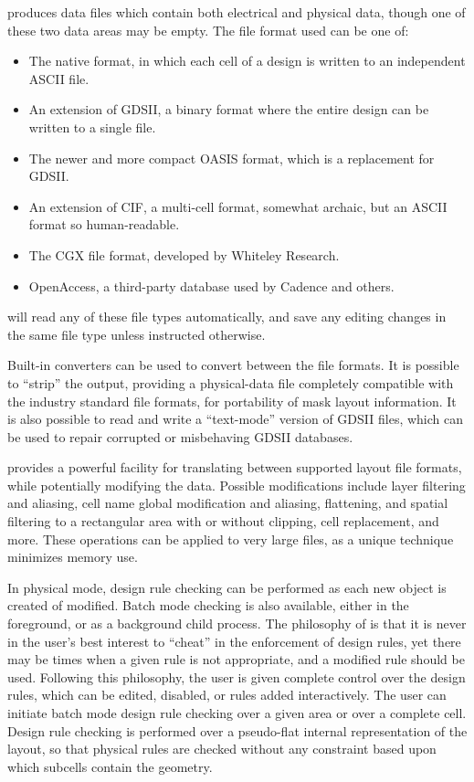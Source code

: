 {\Xic} produces data files which contain both electrical and physical
data, though one of these two data areas may be empty.  The file
format used can be one of:
\begin{itemize}
\item{The native format, in which each cell of a design is written to
an independent ASCII file.}
\item{An extension of GDSII, a binary format where the entire design    
can be written to a single file.}
\item{The newer and more compact OASIS format, which is a replacement
for GDSII.}
\item{An extension of CIF, a multi-cell format, somewhat archaic,
but an ASCII format so human-readable.}
\item{The CGX file format, developed by Whiteley Research.}
\item{OpenAccess, a third-party database used by Cadence and others.}
\end{itemize}
{\Xic} will read any of these file types automatically, and save any
editing changes in the same file type unless instructed otherwise.

Built-in converters can be used to convert between the file formats. 
It is possible to ``strip'' the output, providing a
physical-data file completely compatible with the industry standard
file formats, for portability of mask layout information.  It is also
possible to read and write a ``text-mode'' version of GDSII files,
which can be used to repair corrupted or misbehaving GDSII databases.

{\Xic} provides a powerful facility for translating between supported
layout file formats, while potentially modifying the data.  Possible
modifications include layer filtering and aliasing, cell name global
modification and aliasing, flattening, and spatial filtering to a
rectangular area with or without clipping, cell replacement, and more. 
These operations can be applied to very large files, as a unique
technique minimizes memory use.

In physical mode, design rule checking can be performed as each new
object is created of modified.  Batch mode checking is also available,
either in the foreground, or as a background child process.  The
philosophy of {\Xic} is that it is never in the user's best interest
to ``cheat'' in the enforcement of design rules, yet there may be
times when a given rule is not appropriate, and a modified rule should
be used.  Following this philosophy, the user is given complete
control over the design rules, which can be edited, disabled, or rules
added interactively.  The user can initiate batch mode design rule
checking over a given area or over a complete cell.  Design rule
checking is performed over a pseudo-flat internal representation of
the layout, so that physical rules are checked without any constraint
based upon which subcells contain the geometry.

